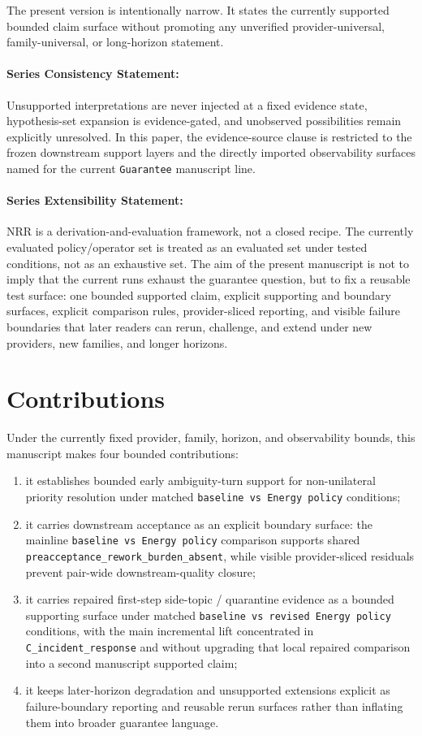 \documentclass[11pt]{article}
\begin{document}
The present version is intentionally narrow. It states the currently supported
bounded claim surface without promoting any unverified provider-universal,
family-universal, or long-horizon statement.

\paragraph{Series Consistency Statement:}
Unsupported interpretations are never injected at a fixed evidence state,
hypothesis-set expansion is evidence-gated, and unobserved possibilities remain
explicitly unresolved. In this paper, the evidence-source clause is restricted to
the frozen downstream support layers and the directly imported observability
surfaces named for the current \texttt{Guarantee} manuscript line.

\paragraph{Series Extensibility Statement:}
NRR is a derivation-and-evaluation framework, not a closed recipe. The currently
evaluated policy/operator set is treated as an evaluated set under tested
conditions, not as an exhaustive set. The aim of the present manuscript is not
to imply that the current runs exhaust the guarantee question, but to fix a
reusable test surface: one bounded supported claim, explicit supporting and
boundary surfaces, explicit comparison rules, provider-sliced reporting, and
visible failure boundaries that later readers can rerun, challenge, and extend
under new providers, new families, and longer horizons.

\section{Contributions}

Under the currently fixed provider, family, horizon, and observability bounds,
this manuscript makes four bounded contributions:

\begin{enumerate}
\item it establishes bounded early ambiguity-turn support for non-unilateral
priority resolution under matched \texttt{baseline vs Energy policy}
conditions;
\item it carries downstream acceptance as an explicit boundary surface: the
mainline \texttt{baseline vs Energy policy} comparison supports shared
\texttt{preacceptance\_rework\_burden\_absent}, while visible provider-sliced
residuals prevent pair-wide downstream-quality closure;
\item it carries repaired first-step side-topic / quarantine evidence as a
bounded supporting surface under matched
\texttt{baseline vs revised Energy policy} conditions, with the main
incremental lift concentrated in \texttt{C\_incident\_response} and without
upgrading that local repaired comparison into a second manuscript supported
claim;
\item it keeps later-horizon degradation and unsupported extensions explicit as
failure-boundary reporting and reusable rerun surfaces rather than inflating
them into broader guarantee language.
\end{enumerate}
\end{document}
